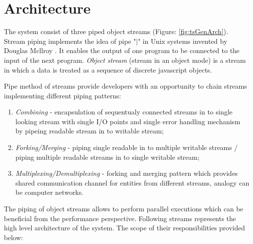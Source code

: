 \chapter{Architecture} 
\label{chap:architectureDesign}

The system consist of three piped object streams  (Figure: \ref{fig:tsGenArch}). Stream piping implements the idea of pipe "$|$" in Unix systems invented by Douglas Mcllroy \cite{pipe}. It enables the output of one program to be connected to the input of the next program. \textit{Object stream} (stream in an object mode) is a stream in which a data is treated as a sequence of discrete javascript objects. 

Pipe method of streams provide developers with an opportunity to chain streams implementing different piping patterns:
\begin{enumerate}
	\item \textit{Combining} - encapsulation of sequentualy connected streams in to single looking stream with single I/O points and single error handling mechanism by pipeing readable stream in to writable stream;
	\item \textit{Forking/Merging} - piping single readable in to multiple writable streams /  piping multiple readable streams in to single writable stream;
	\item \textit{Multiplexing/Demultiplexing} - forking and merging pattern which provides shared communication channel for entities from different streams, analogy can be computer networks.
\end{enumerate}



The piping of object streams allows to perform parallel executions which can be beneficial from the performance perspective. Following streams represents the high level architecture of the system. The scope of their responsibilities provided below:


